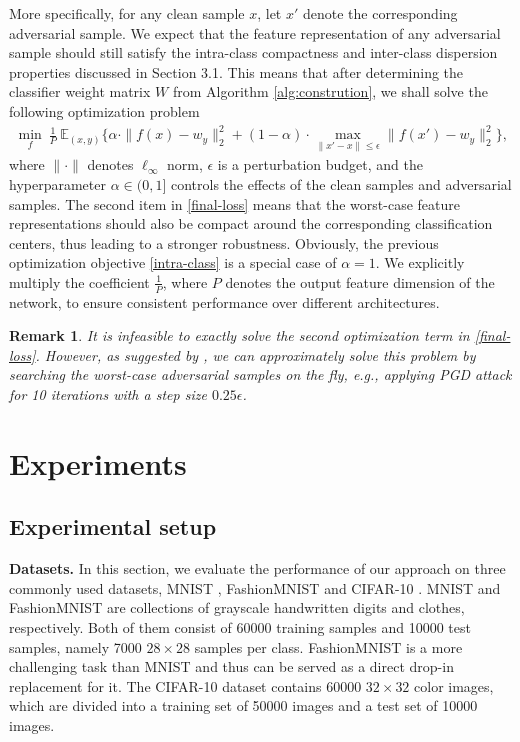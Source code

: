 \documentclass[preprint,review,12pt]{elsarticle}
\newtheorem{rmrk}{Remark}
\numberwithin{equation}{section}
\begin{document}
More specifically, for any clean sample $x$, let $x'$ denote the corresponding adversarial sample.
We expect that the feature representation of any adversarial sample should still satisfy
the intra-class compactness and inter-class dispersion  properties discussed in Section 3.1.
This means that  after  determining the classifier weight matrix $ W $  from Algorithm \ref{alg:constrution},
we shall solve the following optimization problem
\begin{align}
	\label{final-loss}
	\min_{f} \: \frac{1}{P}\: \mathbb{E}_{(x, y) }
      \Bigg\{ \alpha \cdot \|f(x) - w_y\|_2^2 + (1 - \alpha) \cdot \max_{\|x' - x\| \le \epsilon} \|f(x') - w_y\|_2^2 \Bigg\},
\end{align}
where  $\|\cdot\|$ denotes $\ell_{\infty}$ norm, $\epsilon$  is a perturbation budget,
and the hyperparameter $\alpha \in (0, 1]$  controls the effects of the clean samples and adversarial samples.
The second item in \eqref{final-loss} means that the worst-case feature representations should also be compact around the corresponding classification centers,
thus leading to  a stronger robustness.
Obviously, the previous optimization objective \eqref{intra-class} is a special case of $\alpha = 1$.
We explicitly multiply the coefficient $\frac{1}{P}$,
where $ P $ denotes the output feature  dimension of the network,
 to ensure consistent performance over different architectures.

\begin{rmrk}
	It is infeasible to exactly solve the second optimization term in \eqref{final-loss}.
	However, as suggested by \cite{madry2018,zhang2019b},
    we can approximately solve this problem by searching the worst-case adversarial samples on the fly,
    e.g., applying PGD attack for 10 iterations with a step size $0.25\epsilon$.
\end{rmrk}





\section{Experiments}

\subsection{Experimental setup}

\textbf{Datasets.} In this section, we evaluate the performance of our approach on three commonly used datasets,
MNIST \cite{lecun1998}, FashionMNIST \cite{fmnist2017} and CIFAR-10 \cite{krizhevsky2009}.
MNIST and FashionMNIST are collections of grayscale handwritten digits and clothes, respectively.
Both of them consist of 60000 training samples and 10000 test samples, namely 7000 $28 \times 28$ samples per class.
FashionMNIST is a more challenging task than MNIST and thus can be served as a direct drop-in replacement for it.
The CIFAR-10 dataset contains 60000 $32\times 32$ color images, which are divided into a training set of 50000 images and a test set of 10000 images.
\end{document}
